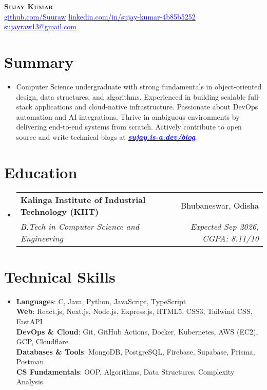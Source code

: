 \documentclass[letterpaper,11pt]{article}
\makeatletter
\newcommand{\resumeSubheading}[4]{
  \vspace{-3pt}\item
  \begin{tabular*}{0.98\textwidth}[t]{l@{\extracolsep{\fill}}r}
    \textbf{#1} & #2 \\
    \textit{\small#3} & \textit{\small #4} \\
  \end{tabular*}\vspace{-6pt}
}
\newcommand{\resumeSubHeadingListStart}{\begin{itemize}[leftmargin=0.1in, label={}]}
\newcommand{\resumeSubHeadingListEnd}{\end{itemize}\vspace{-6pt}}
\makeatother
\begin{document}
\begin{center}
  \textbf{\Huge \scshape Sujay Kumar} \\ \vspace{8pt}
  \small
  \vspace{2pt}
 \href{https://github.com/Suuraw}{\textcolor{blue}{github.com/Suuraw}} \quad
\href{https://linkedin.com/in/sujay-kumar-4b85b5252}{\textcolor{blue}{linkedin.com/in/sujay-kumar-4b85b5252}} \quad
 \href{mailto:sujayraw13@gmail.com}{\textcolor{blue}{sujayraw13@gmail.com}} 
\end{center}
\vspace{-8pt}

\section{Summary}
\vspace{4pt}
\resumeSubHeadingListStart
\item{Computer Science undergraduate with strong fundamentals in object-oriented design, data structures, and algorithms. Experienced in building scalable full-stack applications and cloud-native infrastructure. Passionate about DevOps automation and AI integrations. Thrive in ambiguous environments by delivering end-to-end systems from scratch. Actively contribute to open source and write technical blogs at \href{https://sujay.is-a.dev/blog}{\textcolor{blue}{\textbf{\textit{sujay.is-a.dev/blog}}}}.}
\resumeSubHeadingListEnd

\section{Education}
\vspace{4pt}
\resumeSubHeadingListStart
  \resumeSubheading{Kalinga Institute of Industrial Technology (KIIT)}{Bhubaneswar, Odisha}{B.Tech in Computer Science and Engineering}{Expected Sep 2026, CGPA: 8.11/10}
\resumeSubHeadingListEnd

\section{Technical Skills}
\vspace{4pt}
\resumeSubHeadingListStart
  \item{
    \textbf{Languages}: C, Java, Python, JavaScript, TypeScript \\ \vspace{2pt}
    \textbf{Web}: React.js, Next.js, Node.js, Express.js, HTML5, CSS3, Tailwind CSS, FastAPI \\ \vspace{2pt}
    \textbf{DevOps \& Cloud}: Git, GitHub Actions, Docker, Kubernetes, AWS (EC2), GCP, Cloudflare \\ \vspace{2pt}
    \textbf{Databases \& Tools}: MongoDB, PostgreSQL, Firebase, Supabase, Prisma, Postman \\ \vspace{2pt}
    \textbf{CS Fundamentals}: OOP, Algorithms, Data Structures, Complexity Analysis
  }
\resumeSubHeadingListEnd
\end{document}
